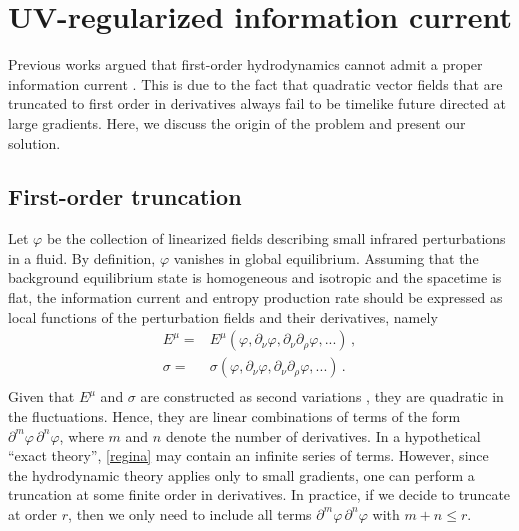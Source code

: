 \documentclass[a4paper, amsfonts, amssymb, amsmath, reprint, showkeys, nofootinbib, twoside,notitlepage,onecolumn,preprintnumbers]{revtex4-2}
\theoremstyle{definition}
\theoremstyle{theorem}
\theoremstyle{corollary}
\begin{document}
\section{UV-regularized information current} \label{doodlebob}

Previous works argued that first-order hydrodynamics cannot admit a proper information current \cite{GavassinoLyapunov_2020,DoreGavassino2022}. This is due to the fact that quadratic vector fields that are truncated to first order in derivatives always fail to be timelike future directed at large gradients. Here, we discuss the origin of the problem and present our solution.



\subsection{First-order truncation}

Let $\varphi$ be the collection of linearized fields describing small infrared perturbations in a fluid. By definition, $\varphi$ vanishes in global equilibrium. Assuming that the background equilibrium state is homogeneous and isotropic and the spacetime is flat, the information current and entropy production rate should be expressed as local functions of the perturbation fields and their derivatives, namely
\begin{equation}\label{regina}
\begin{split}
E^\mu ={}& E^\mu (\varphi, \partial_\nu \varphi, \partial_\nu \partial_\rho \varphi,...) \, , \\
\sigma ={}& \sigma (\varphi, \partial_\nu \varphi, \partial_\nu \partial_\rho \varphi,...) \, . \\
\end{split}
\end{equation} 
Given that $E^\mu$ and $\sigma$ are constructed as second variations \cite{GavassinoGibbs2021}, they are quadratic in the fluctuations. Hence, they are linear combinations of terms of the form $\partial^m \varphi \, \partial^n \varphi$, where $m$ and $n$ denote the number of derivatives. In a hypothetical ``exact theory'', \eqref{regina} may contain an infinite series of terms.  However, since the hydrodynamic theory applies only to small gradients, one can perform a truncation at some finite order in derivatives. In practice, if we decide to truncate at order $r$, then we only need to include all terms $\partial^m \varphi \, \partial^n \varphi$ with $m+n\leq r$. 
\end{document}
